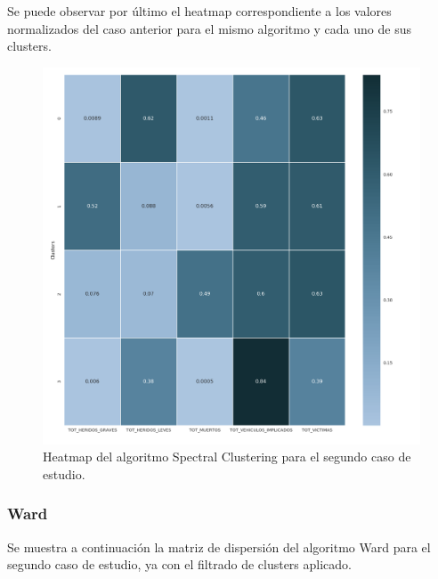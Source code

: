 	Se puede observar por último el heatmap correspondiente a los valores normalizados del caso anterior para el mismo algoritmo y cada uno de sus clusters.
	
	\begin{figure}[H]
		\centering
		\includegraphics[scale=0.4]{heatmaps/SpectralClustering-EarlyMorningAccidents-Heatmap.png}
		\caption{Heatmap del algoritmo Spectral Clustering para el segundo caso de estudio.}
	\end{figure}
	
	\subsubsection{Ward}
	Se muestra a continuación la matriz de dispersión del algoritmo Ward para el segundo caso de estudio, ya con el filtrado de clusters aplicado.
	
